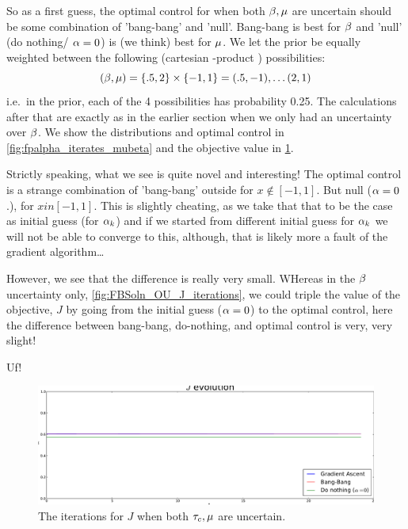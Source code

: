 \documentclass{article}
\begin{document}
So as a first guess, the optimal control for when both ${\beta},{\mu }$ are uncertain
should be some combination of 'bang-bang' and 'null'. Bang-bang is best for ${\beta}$
and 'null' (do nothing/ ${\alpha}=0$) is (we think) best for ${\mu }$.
We let the prior be equally weighted between the following (cartesian
-product ) possibilities:
$$
({\beta}, {\mu }) =\{.5, 2\} \times \{-1,1\} = (.5,-1), \ldots (2,1)
$$
i.e.\ in the prior, each of the 4 possibilities has probability
0.25. The calculations after that are exactly as in the earlier section when we only had
an uncertainty over ${\beta}$. We show the distributions and optimal control in
\cref{fig:fpalpha_iterates_mubeta} and the objective value in
\cref{fig:OU_mubeta_Jiterates}. 

Strictly speaking, what we see is quite novel and interesting! The optimal
control is a strange combination of 'bang-bang' outside for  $x \notin [-1,1]$.
But null (${\alpha}=0$.), for $x in [-1,1]$. This is slightly cheating, as we take
that that to be the case as initial guess (for ${\alpha}_k$) and if we started from
different initial guess for ${\alpha}_k$ we will not be able to converge to this,
although, that is likely more a fault of the gradient algorithm\ldots

However, we see that the difference is really very small. WHereas in the ${\beta}$
uncertainty only,   \cref{fig:FBSoln_OU_J_iterations}, we could triple the value
of the objective, $J$ by going from the initial guess (${\alpha}=0$) to the optimal
control, here the difference between bang-bang, do-nothing, and optimal control
is very, very slight!

Uf!


\begin{figure}[htp]
\begin{center}
  \includegraphics[width=1\textwidth]{Figs/OUFBSolver_BetaMu/FB_J_iterates_uICs_Tf=2.pdf}
  \caption[tableofCs]{The iterations for $J$ when both ${ \tau_{c} }, {\mu }$ are
  uncertain.}
  \label{fig:OU_mubeta_Jiterates}
\end{center}
\end{figure}
\end{document}
